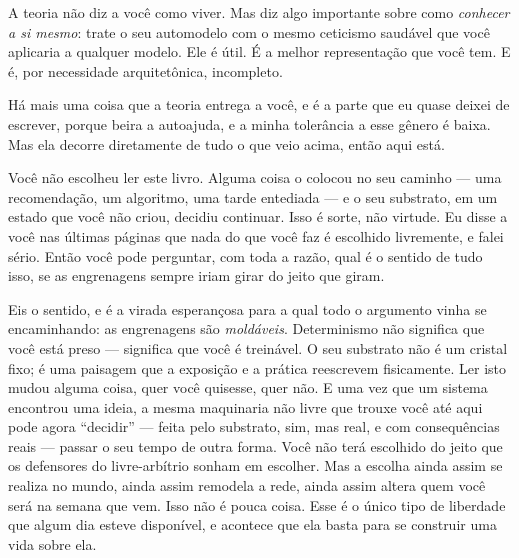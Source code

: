 \documentclass[11pt, twoside, openright]{book}
\begin{document}
A teoria não diz a você como viver. Mas diz algo importante sobre como \textit{conhecer a si mesmo}: trate o seu automodelo com o mesmo ceticismo saudável que você aplicaria a qualquer modelo. Ele é útil. É a melhor representação que você tem. E é, por necessidade arquitetônica, incompleto.

Há mais uma coisa que a teoria entrega a você, e é a parte que eu quase deixei de escrever, porque beira a autoajuda, e a minha tolerância a esse gênero é baixa. Mas ela decorre diretamente de tudo o que veio acima, então aqui está.

Você não escolheu ler este livro. Alguma coisa o colocou no seu caminho --- uma recomendação, um algoritmo, uma tarde entediada --- e o seu substrato, em um estado que você não criou, decidiu continuar. Isso é sorte, não virtude. Eu disse a você nas últimas páginas que nada do que você faz é escolhido livremente, e falei sério. Então você pode perguntar, com toda a razão, qual é o sentido de tudo isso, se as engrenagens sempre iriam girar do jeito que giram.

Eis o sentido, e é a virada esperançosa para a qual todo o argumento vinha se encaminhando: as engrenagens são \textit{moldáveis}. Determinismo não significa que você está preso --- significa que você é treinável. O seu substrato não é um cristal fixo; é uma paisagem que a exposição e a prática reescrevem fisicamente. Ler isto mudou alguma coisa, quer você quisesse, quer não. E uma vez que um sistema encontrou uma ideia, a mesma maquinaria não livre que trouxe você até aqui pode agora ``decidir'' --- feita pelo substrato, sim, mas real, e com consequências reais --- passar o seu tempo de outra forma. Você não terá escolhido do jeito que os defensores do livre-arbítrio sonham em escolher. Mas a escolha ainda assim se realiza no mundo, ainda assim remodela a rede, ainda assim altera quem você será na semana que vem. Isso não é pouca coisa. Esse é o único tipo de liberdade que algum dia esteve disponível, e acontece que ela basta para se construir uma vida sobre ela.
\end{document}
